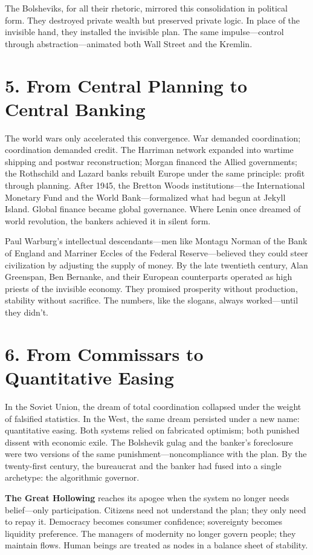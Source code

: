 \documentclass[11pt,twoside]{book}
\begin{document}
The Bolsheviks, for all their rhetoric, mirrored this consolidation in political form.  
They destroyed private wealth but preserved private logic.  
In place of the invisible hand, they installed the invisible plan.  
The same impulse—control through abstraction—animated both Wall Street and the Kremlin.

\section*{5. From Central Planning to Central Banking}

The world wars only accelerated this convergence.  
War demanded coordination; coordination demanded credit.  
The Harriman network expanded into wartime shipping and postwar reconstruction; Morgan financed the Allied governments; the Rothschild and Lazard banks rebuilt Europe under the same principle: profit through planning.  
After 1945, the Bretton Woods institutions—the International Monetary Fund and the World Bank—formalized what had begun at Jekyll Island.  
Global finance became global governance.  
Where Lenin once dreamed of world revolution, the bankers achieved it in silent form.

Paul Warburg’s intellectual descendants—men like Montagu Norman of the Bank of England and Marriner Eccles of the Federal Reserve—believed they could steer civilization by adjusting the supply of money.  
By the late twentieth century, Alan Greenspan, Ben Bernanke, and their European counterparts operated as high priests of the invisible economy.  
They promised prosperity without production, stability without sacrifice.  
The numbers, like the slogans, always worked—until they didn’t.

\section*{6. From Commissars to Quantitative Easing}

In the Soviet Union, the dream of total coordination collapsed under the weight of falsified statistics.  
In the West, the same dream persisted under a new name: quantitative easing.  
Both systems relied on fabricated optimism; both punished dissent with economic exile.  
The Bolshevik gulag and the banker’s foreclosure were two versions of the same punishment—noncompliance with the plan.  
By the twenty-first century, the bureaucrat and the banker had fused into a single archetype: the algorithmic governor.

\textbf{The Great Hollowing} reaches its apogee when the system no longer needs belief—only participation.  
Citizens need not understand the plan; they only need to repay it.  
Democracy becomes consumer confidence; sovereignty becomes liquidity preference.  
The managers of modernity no longer govern people; they maintain flows.  
Human beings are treated as nodes in a balance sheet of stability.
\end{document}
